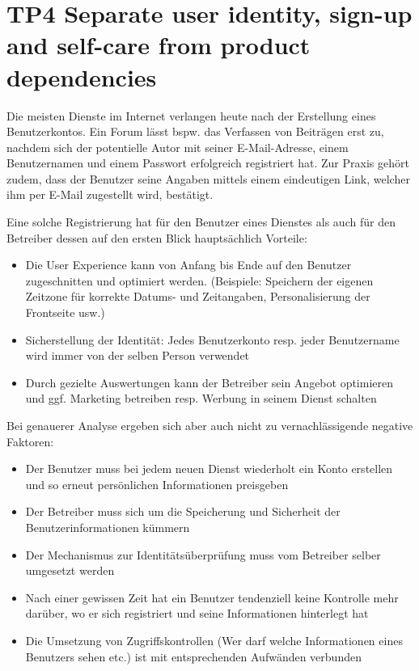 \section{TP4 Separate user identity, sign-up and self-care from product dependencies}
\label{sec:principle-tp4-seperate-user-identity}

Die meisten Dienste im Internet verlangen heute nach der Erstellung eines Benutzerkontos. Ein Forum lässt bspw. das Verfassen von Beiträgen erst zu, nachdem sich der potentielle Autor mit seiner E-Mail-Adresse, einem Benutzernamen und einem Passwort erfolgreich registriert hat. Zur Praxis gehört zudem, dass der Benutzer seine Angaben mittels einem eindeutigen Link, welcher ihm per E-Mail zugestellt wird, bestätigt.

Eine solche Registrierung hat für den Benutzer eines Dienstes als auch für den Betreiber dessen auf den ersten Blick hauptsächlich Vorteile:

\begin{itemize}
	\item Die User Experience kann von Anfang bis Ende auf den Benutzer zugeschnitten und optimiert werden. (Beispiele: Speichern der eigenen Zeitzone für korrekte Datums- und Zeitangaben, Personalisierung der Frontseite usw.)
	\item Sicherstellung der Identität: Jedes Benutzerkonto resp. jeder Benutzername wird immer von der selben Person verwendet
	\item Durch gezielte Auswertungen kann der Betreiber sein Angebot optimieren und ggf. Marketing betreiben resp. Werbung in seinem Dienst schalten
\end{itemize}

Bei genauerer Analyse ergeben sich aber auch nicht zu vernachlässigende negative Faktoren:

\begin{itemize}
	\item Der Benutzer muss bei jedem neuen Dienst wiederholt ein Konto erstellen und so erneut persönlichen Informationen preisgeben
	\item Der Betreiber muss sich um die Speicherung und Sicherheit der Benutzerinformationen kümmern
	\item Der Mechanismus zur Identitätsüberprüfung muss vom Betreiber selber umgesetzt werden
	\item Nach einer gewissen Zeit hat ein Benutzer tendenziell keine Kontrolle mehr darüber, wo er sich registriert und seine Informationen hinterlegt hat
	\item Die Umsetzung von Zugriffskontrollen (Wer darf welche Informationen eines Benutzers sehen etc.) ist mit entsprechenden Aufwänden verbunden
\end{itemize}

